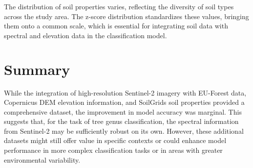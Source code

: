 The distribution of soil properties varies, reflecting the diversity of soil types across the study area. The z-score distribution standardizes these values, bringing them onto a common scale, which is essential for integrating soil data with spectral and elevation data in the classification model.

\section{Summary}

While the integration of high-resolution Sentinel-2 imagery with EU-Forest data, Copernicus DEM elevation information, and SoilGrids soil properties provided a comprehensive dataset, the improvement in model accuracy was marginal. This suggests that, for the task of tree genus classification, the spectral information from Sentinel-2 may be sufficiently robust on its own. However, these additional datasets might still offer value in specific contexts or could enhance model performance in more complex classification tasks or in areas with greater environmental variability.